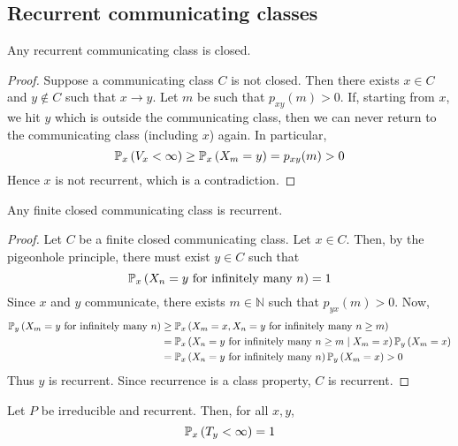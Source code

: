 \subsection{Recurrent communicating classes}
\begin{theorem}
	Any recurrent communicating class is closed.
\end{theorem}
\begin{proof}
	Suppose a communicating class \( C \) is not closed.
	Then there exists \( x \in C \) and \( y \not\in C \) such that \( x \to y \).
	Let \( m \) be such that \( p_{xy}(m) > 0 \).
	If, starting from \( x \), we hit \( y \) which is outside the communicating class, then we can never return to the communicating class (including \( x \)) again.
	In particular,
	\[
		\mathbb{P}_{x}\left({V_x < \infty}\right) \geq \mathbb{P}_{x}\left({X_m = y}\right) = p_{xy}(m) > 0
	\]
	Hence \( x \) is not recurrent, which is a contradiction.
\end{proof}
\begin{theorem}
	Any finite closed communicating class is recurrent.
\end{theorem}
\begin{proof}
	Let \( C \) be a finite closed communicating class.
	Let \( x \in C \).
	Then, by the pigeonhole principle, there must exist \( y \in C \) such that
	\[
		\mathbb{P}_{x}\left({X_n = y \text{ for infinitely many } n}\right) = 1
	\]
	Since \( x \) and \( y \) communicate, there exists \( m \in \mathbb N \) such that \( p_{yx}(m) > 0 \).
	Now,
	\begin{align*}
		\mathbb{P}_{y}\left({X_m = y \text{ for infinitely many } n}\right) & \geq \mathbb{P}_{x}\left({X_m = x, X_n = y \text{ for infinitely many } n \geq m}\right)                   \\
		                                                 & =\mathbb{P}_{x}\left({X_n = y \text{ for infinitely many } n \geq m \mid X_m = x}\right) \mathbb{P}_{y}\left({X_m = x}\right) \\
		                                                 & =\mathbb{P}_{x}\left({X_n = y \text{ for infinitely many } n}\right) \mathbb{P}_{y}\left({X_m = x}\right) > 0
	\end{align*}
	Thus \( y \) is recurrent.
	Since recurrence is a class property, \( C \) is recurrent.
\end{proof}
\begin{theorem}
	Let \( P \) be irreducible and recurrent.
	Then, for all \( x, y \),
	\[
		\mathbb{P}_{x}\left({T_y < \infty}\right) = 1
	\]
\end{theorem}
